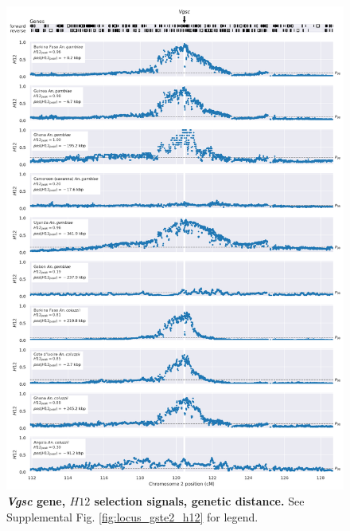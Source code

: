 \documentclass[a4paper,11pt,abstracton,hidelinks]{scrartcl}
\begin{document}
\begin{figure}[t!]
	\begin{center}
		\includegraphics*[width=1\linewidth,center]{artwork/locus_vgsc_h12_gdist.png}
	\end{center}
	\caption[\textit{Vgsc} gene, $H12$ selection signals, genetic distance]{
	\textbf{\textit{Vgsc} gene, $H12$ selection signals, genetic distance.}
	See Supplemental Fig. \ref{fig:locus_gste2_h12} for legend.
	} 
	\label{fig:locus_vgsc_h12_gdist}
\end{figure}


%
%
\end{document}
